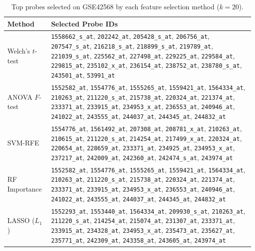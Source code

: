 \begin{table}[H]
\centering
\caption{Top probes selected on GSE42568 by each feature selection method ($k=20$).}
\label{tab:gse42568_probes}
\small
\begin{tabular}{lp{10cm}}
\toprule
\textbf{Method} & \textbf{Selected Probe IDs} \\
\midrule
Welch's $t$-test &
  \texttt{1558662\_s\_at}, \texttt{202242\_at}, \texttt{205428\_s\_at}, \texttt{206756\_at},
  \texttt{207547\_s\_at}, \texttt{216218\_s\_at}, \texttt{218899\_s\_at}, \texttt{219789\_at},
  \texttt{221039\_s\_at}, \texttt{225562\_at}, \texttt{227498\_at}, \texttt{229225\_at},
  \texttt{229584\_at}, \texttt{229815\_at}, \texttt{235102\_x\_at}, \texttt{236154\_at},
  \texttt{238752\_at}, \texttt{238780\_s\_at}, \texttt{243501\_at}, \texttt{53991\_at} \\
\midrule
ANOVA $F$-test &
  \texttt{1552582\_at}, \texttt{1554776\_at}, \texttt{1555265\_at}, \texttt{1559421\_at},
  \texttt{1564334\_at}, \texttt{210263\_at}, \texttt{211220\_s\_at}, \texttt{215738\_at},
  \texttt{220324\_at}, \texttt{221374\_at}, \texttt{233371\_at}, \texttt{233915\_at},
  \texttt{234953\_x\_at}, \texttt{236553\_at}, \texttt{240946\_at}, \texttt{241022\_at},
  \texttt{243555\_at}, \texttt{244037\_at}, \texttt{244345\_at}, \texttt{244832\_at} \\
\midrule
SVM-RFE &
  \texttt{1554776\_at}, \texttt{1561492\_at}, \texttt{207308\_at}, \texttt{208781\_x\_at},
  \texttt{210263\_at}, \texttt{210615\_at}, \texttt{211220\_s\_at}, \texttt{214254\_at},
  \texttt{217499\_x\_at}, \texttt{220324\_at}, \texttt{220654\_at}, \texttt{228659\_at},
  \texttt{233371\_at}, \texttt{234925\_at}, \texttt{234953\_x\_at}, \texttt{237217\_at},
  \texttt{242009\_at}, \texttt{242360\_at}, \texttt{242474\_s\_at}, \texttt{243974\_at} \\
\midrule
RF Importance &
  \texttt{1552582\_at}, \texttt{1554776\_at}, \texttt{1555265\_at}, \texttt{1559421\_at},
  \texttt{1564334\_at}, \texttt{210263\_at}, \texttt{211220\_s\_at}, \texttt{215738\_at},
  \texttt{220324\_at}, \texttt{221374\_at}, \texttt{233371\_at}, \texttt{233915\_at},
  \texttt{234953\_x\_at}, \texttt{236553\_at}, \texttt{240946\_at}, \texttt{241022\_at},
  \texttt{243555\_at}, \texttt{244037\_at}, \texttt{244345\_at}, \texttt{244832\_at} \\
\midrule
LASSO ($L_1$) &
  \texttt{1552293\_at}, \texttt{1553440\_at}, \texttt{1564334\_at}, \texttt{209930\_s\_at},
  \texttt{210263\_at}, \texttt{211220\_s\_at}, \texttt{214254\_at}, \texttt{215074\_at},
  \texttt{231307\_at}, \texttt{233371\_at}, \texttt{233915\_at}, \texttt{234328\_at},
  \texttt{234953\_x\_at}, \texttt{235473\_at}, \texttt{235627\_at}, \texttt{235771\_at},
  \texttt{242309\_at}, \texttt{243358\_at}, \texttt{243605\_at}, \texttt{243974\_at} \\
\bottomrule
\end{tabular}
\end{table}

